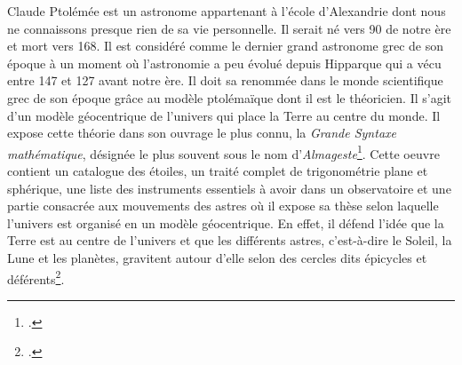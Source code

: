 \documentclass[a4paper,12pt,twoside]{book}
\begin{document}
	
	Claude Ptolémée est un astronome appartenant à l'école d'Alexandrie dont nous ne connaissons presque rien de sa vie personnelle. Il serait né vers 90 de notre ère et mort vers 168. Il est considéré comme le dernier grand astronome grec de son époque à un moment où l'astronomie a peu évolué depuis Hipparque qui a vécu entre 147 et 127 avant notre ère. Il doit sa renommée dans le monde scientifique grec de son époque grâce au modèle ptolémaïque dont il est le théoricien. Il s'agit d'un modèle géocentrique de l'univers qui place la Terre au centre du monde. Il expose cette théorie dans son ouvrage le plus connu, la \textit{Grande Syntaxe mathématique}, désignée le plus souvent sous le nom d'\textit{Almageste}\footcite{verdetLaubeLastronomieLaurore1990}. Cette oeuvre contient un catalogue des étoiles, un traité complet de trigonométrie plane et sphérique, une liste des instruments essentiels à avoir dans un observatoire et une partie consacrée aux mouvements des astres où il expose sa thèse selon laquelle l'univers est organisé en un modèle géocentrique. En effet, il défend l'idée que la Terre est au centre de l'univers et que les différents astres, c'est-à-dire le Soleil, la Lune et les planètes, gravitent autour d'elle selon des cercles dits épicycles et déférents\footcite{costabelCLAUDEPTOLEMEE90}.
	
\end{document}
